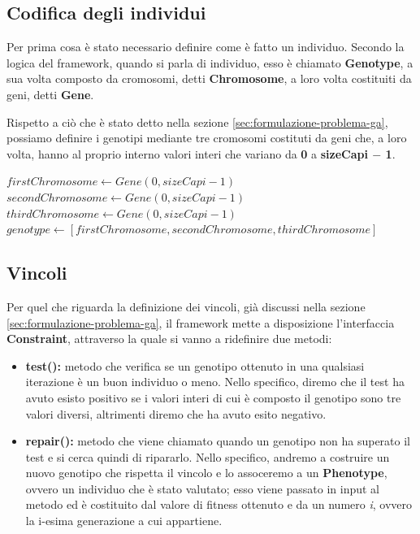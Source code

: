 \documentclass[a4paper, 11pt, oneside]{report}
\begin{document}
                \subsection{Codifica degli individui}
                \par \noindent Per prima cosa è stato necessario definire come è fatto un individuo.
                Secondo la logica del framework, quando si parla di individuo, esso è chiamato \textbf{Genotype}, a sua volta composto
                da cromosomi, detti \textbf{Chromosome}, a loro volta costituiti da geni, detti
                \textbf{Gene}.
                \medskip
                \par \noindent Rispetto a ciò che è stato detto nella sezione \ref{sec:formulazione-problema-ga}, possiamo definire
                i genotipi mediante tre cromosomi costituti da geni che, a loro volta, hanno al proprio interno valori
                interi che variano da \textbf{0} a \textbf{sizeCapi $-$ 1}.
                \medskip
                \begin{algorithmic}[1]
                    \State $firstChromosome \gets Gene(0,sizeCapi-1)$
                    \State $secondChromosome \gets Gene(0,sizeCapi-1)$
                    \State $thirdChromosome \gets Gene(0,sizeCapi-1)$
                    \State $genotype \gets [firstChromosome, secondChromosome, thirdChromosome]$
                \end{algorithmic}

                \subsection{Vincoli}
                \par \noindent Per quel che riguarda la definizione dei vincoli, già discussi nella sezione \ref{sec:formulazione-problema-ga},
                il framework mette a disposizione l'interfaccia \textbf{Constraint}, attraverso la quale si vanno a ridefinire
                due metodi:
                \begin{itemize}
                    \item \textbf{test():} metodo che verifica se un genotipo ottenuto in una qualsiasi iterazione è un
                    buon individuo o meno.
                    Nello specifico, diremo che il test ha avuto esisto positivo se i valori interi di cui è composto il
                    genotipo sono tre valori diversi, altrimenti diremo che ha avuto esito negativo.
                    \item \textbf{repair():} metodo che viene chiamato quando un genotipo non ha superato il test e si
                    cerca quindi di ripararlo.
                    Nello specifico, andremo a costruire un nuovo genotipo che rispetta il vincolo e lo assoceremo a un
                    \textbf{Phenotype}, ovvero un individuo che è stato valutato;
                    esso viene passato in input al metodo ed è costituito dal valore di fitness ottenuto e da un numero \emph{i},
                    ovvero la i-esima generazione
                    a cui appartiene.
                \end{itemize}
\end{document}
